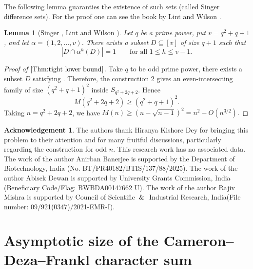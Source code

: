 \documentclass[12pt]{article}
\newtheorem{lemma}{Lemma}[section]
\theoremstyle{definition}
\newtheorem*{acknowledgement}{Acknowledgement}
\newcommand{\1}{\mathbf 1}
\begin{document}
The following lemma guaranties the existence of such sets (called Singer difference sets). For the proof one can see the book by Lint and Wilson \cite{van2001course}.

\begin{lemma}[Singer \cite{singer1938theorem}, Lint and Wilson \cite{van2001course}]\label{lem:SingerSet}
    Let $q$ be a prime power, put $v=q^2+q+1$, and let $\alpha=(1,2,\ldots,v)$. There exists a subset $D\subseteq [v]$ of size $q+1$ such that 
    $$|D\cap \alpha^h(D)|=1\qquad \text{for all }1\leq h\leq v-1.$$
\end{lemma}
\begin{proof}[Proof of $\Cref{Thm:tight lower bound}$]
    

Take $q$ to be odd prime power, there exists a subset $D$ satisfying . Therefore, the construction 2 gives an even-intersecting family of size $(q^2+q+1)^2$ inside $S_{q^2+2q+2}$.  Hence $$M(q^2+2q+2)\geq (q^2+q+1)^2.$$
Taking $n=q^2+2q+2$, we have 
$M(n)\geq (n-\sqrt{n-1})^2=n^2-O(n^{3/2}).$
\end{proof}
















\begin{acknowledgement}
The authors thank Hiranya Kishore Dey for bringing this problem to their attention and for many fruitful discussions, particularly regarding the construction for odd $n$.
 This research work has no associated data. 
 The work of the author Anirban Banerjee is supported by the Department of Biotechnology, India (No. BT/PR40182/BTIS/137/88/2025).
  The work of the author Abisek Dewan is supported by University Grants Commission, India (Beneficiary Code/Flag: BWBDA00147662 U).
 The work of the author Rajiv Mishra is supported by Council of Scientific $\And$ Industrial Research, India(File number: 09/921(0347)/2021-EMR-I).   
\end{acknowledgement}



 	
    \nocite{*}


\appendix
\section{Asymptotic size of the Cameron--Deza--Frankl character sum}
\label{app:CDF-asymptotic}
\end{document}
